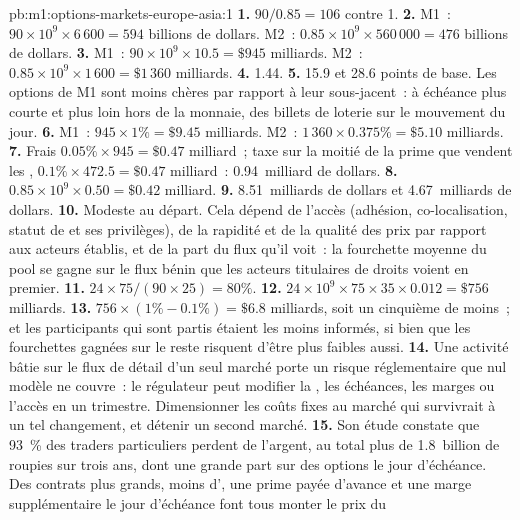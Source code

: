 \begin{solution}{pb:m1:options-markets-europe-asia:1}
\textbf{1.} $90/0.85 = 106$ contre 1.
\textbf{2.} M1~: $90 \times 10^9 \times 6\,600 = 594$ billions de dollars. M2~: $0.85 \times
10^9 \times 560\,000 = 476$ billions de dollars.
\textbf{3.} M1~: $90 \times 10^9 \times 10.5 = \$945$ milliards. M2~: $0.85 \times 10^9
\times 1\,600 = \$1\,360$ milliards.
\textbf{4.} 1.44.
\textbf{5.} 15.9 et 28.6 points de base. Les options de M1 sont moins chères par rapport à
leur sous-jacent~: à échéance plus courte et plus loin hors de la monnaie, des
billets de loterie sur le mouvement du jour.
\textbf{6.} M1~: $945 \times 1\% = \$9.45$ milliards. M2~: $1\,360 \times 0.375\% =
\$5.10$ milliards.
\textbf{7.} Frais $0.05\% \times 945 = \$0.47$ milliard~; taxe sur la moitié de
la prime que vendent les , $0.1\% \times 472.5 = \$0.47$ milliard~: 0.94~milliard de dollars.
\textbf{8.} $0.85 \times 10^9 \times 0.50 = \$0.42$ milliard.
\textbf{9.} 8.51~milliards de dollars et 4.67~milliards de dollars.
\textbf{10.} Modeste au départ. Cela dépend de l'accès (adhésion,
co-localisation, statut de  et ses privilèges), de la rapidité et de la qualité
des prix par rapport aux acteurs établis, et de la part du flux qu'il voit~:
la fourchette moyenne du pool se gagne sur le flux bénin que les acteurs
titulaires de droits voient en premier.
\textbf{11.} $24 \times 75/(90 \times 25) = 80\%$.
\textbf{12.} $24 \times 10^9 \times 75 \times 35 \times 0.012 = \$756$ milliards.
\textbf{13.} $756 \times (1\% - 0.1\%) = \$6.8$ milliards, soit un cinquième de moins~; et
les participants qui sont partis étaient les moins informés, si bien que les
fourchettes gagnées sur le reste risquent d'être plus faibles aussi.
\textbf{14.} Une activité bâtie sur le flux de détail d'un seul marché porte un risque
réglementaire que nul modèle ne couvre~: le régulateur peut modifier la ,
les échéances, les marges ou l'accès en un trimestre. Dimensionner les coûts fixes
au marché qui survivrait à un tel changement, et détenir un second marché.
\textbf{15.} Son étude constate que 93~\% des traders particuliers perdent de l'argent, au
total plus de 1.8~billion de roupies sur trois ans, dont une grande part sur des options
le jour d'échéance. Des contrats plus grands, moins d', une prime
payée d'avance et une marge supplémentaire le jour d'échéance font tous monter le prix du

\end{solution}
